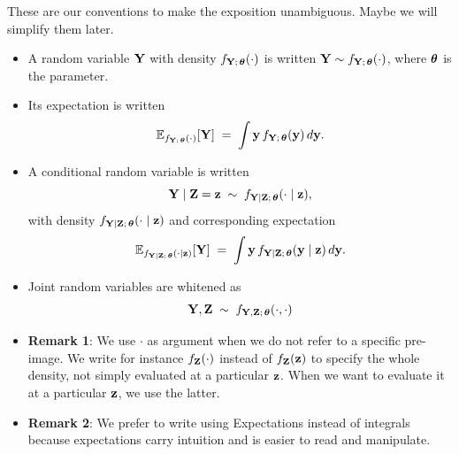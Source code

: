These are our conventions to make the exposition unambiguous. Maybe we will simplify them later. 
\begin{itemize}
    \item A random variable ${\bf Y}$ with density $f_{{\bf Y};\,{\bm{\theta}}}(\cdot)$ is written ${\bf Y} \sim f_{{\bf Y};\,{\bm{\theta}}}(\cdot)$, where ${\bm{\theta}}$ is the parameter.
    \item Its expectation is written 
    \[
      \mathbb{E}_{f_{{\bf Y};\,{\bm{\theta}}}(\cdot)}[{\bf Y}] 
      \;=\; \int {\bf y} \, f_{{\bf Y};\,{\bm{\theta}}}({\bf y})\, d{\bf y}.
    \]
    \item A conditional random variable is written 
    \[
      {\bf Y} \mid {\bf Z}={\bf z} \;\sim\; f_{{\bf Y} \mid {\bf Z};\,{\bm{\theta}}}(\cdot \mid {\bf z}), 
    \]
    with density $f_{{\bf Y} \mid {\bf Z};\,{\bm{\theta}}}(\cdot \mid {\bf z})$ and corresponding expectation
    \[
      \mathbb{E}_{f_{{\bf Y} \mid {\bf Z};\,{\bm{\theta}}}(\cdot \mid {\bf z})}[{\bf Y}] 
      \;=\; \int {\bf y} \, f_{{\bf Y} \mid {\bf Z};\,{\bm{\theta}}}({\bf y} \mid {\bf z})\, d{\bf y}.
    \]
    \item Joint random variables are whitened as 
    \[
        {\bf Y}, {\bf Z} \;\sim\; f_{{\bf Y},{\bf Z};\,{\bm{\theta}}}(\cdot, \cdot)
    \]
    
    \item \textbf{Remark 1}: We use $\cdot$ as argument when we do not refer to a specific pre-image. We write for instance $f_{{\bf Z}}(\cdot)$ instead of $f_{{\bf Z}}({\bf z})$ to specify the whole density, not simply evaluated at a particular ${\bf z}$. When we want to evaluate it at a particular ${\bf z}$, we use the latter.
    \item \textbf{Remark 2}: We prefer to write using Expectations instead of integrals because expectations carry intuition and is easier to read and manipulate.
\end{itemize}